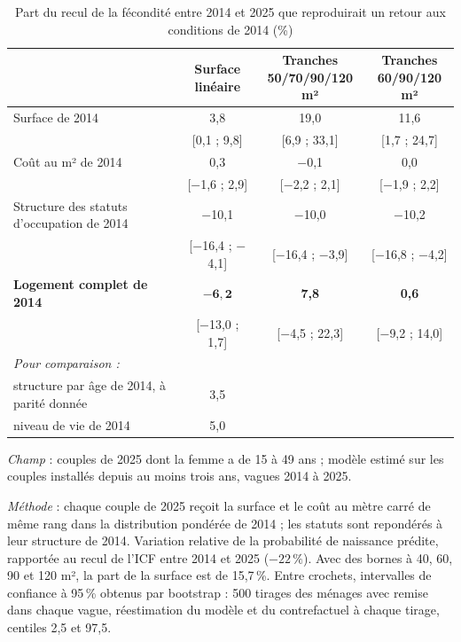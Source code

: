 \documentclass[11pt,a4paper]{article}
\theoremstyle{plain}
\theoremstyle{definition}
\theoremstyle{remark}
\begin{document}
\begin{table}[htbp]
\centering\small
\begin{threeparttable}
\caption{Part du recul de la fécondité entre 2014 et 2025 que reproduirait un retour aux conditions de 2014 (\%)}\label{tab:decompo}
\begin{tabular}{@{}lccc@{}}
\toprule
& \shortstack{Surface\\linéaire} & \shortstack{Tranches\\50/70/90/120 m²} & \shortstack{Tranches\\60/90/120 m²} \\
\midrule
Surface de 2014                              & 3,8 & 19,0 & 11,6 \\
                                             & [0,1 ; 9,8] & [6,9 ; 33,1] & [1,7 ; 24,7] \\
Coût au m² de 2014                           & 0,3 & $-$0,1 & 0,0 \\
                                             & [$-$1,6 ; 2,9] & [$-$2,2 ; 2,1] & [$-$1,9 ; 2,2] \\
Structure des statuts d'occupation de 2014   & $-$10,1 & $-$10,0 & $-$10,2 \\
                                             & [$-$16,4 ; $-$4,1] & [$-$16,4 ; $-$3,9] & [$-$16,8 ; $-$4,2] \\
\textbf{Logement complet de 2014}            & $\mathbf{-6{,}2}$ & \textbf{7,8} & \textbf{0,6} \\
                                             & [$-$13,0 ; 1,7] & [$-$4,5 ; 22,3] & [$-$9,2 ; 14,0] \\
\addlinespace
\textit{Pour comparaison :} & & & \\
\quad structure par âge de 2014, à parité donnée & 3,5 & & \\
\quad niveau de vie de 2014                  & 5,0 & & \\
\bottomrule
\end{tabular}
\begin{tablenotes}\scriptsize
\item \textit{Champ} : couples de 2025 dont la femme a de 15 à 49 ans ; modèle estimé sur les couples installés depuis au moins trois ans, vagues 2014 à 2025.
\item \textit{Méthode} : chaque couple de 2025 reçoit la surface et le coût au mètre carré de même rang dans la distribution pondérée de 2014 ; les statuts sont repondérés à leur structure de 2014. Variation relative de la probabilité de naissance prédite, rapportée au recul de l'ICF entre 2014 et 2025 ($-22\,\%$). Avec des bornes à 40, 60, 90 et 120 m², la part de la surface est de 15,7\,\%. Entre crochets, intervalles de confiance à 95\,\% obtenus par bootstrap : 500 tirages des ménages avec remise dans chaque vague, réestimation du modèle et du contrefactuel à chaque tirage, centiles 2,5 et 97,5.

\end{tablenotes}
\end{threeparttable}
\end{table}
\end{document}
